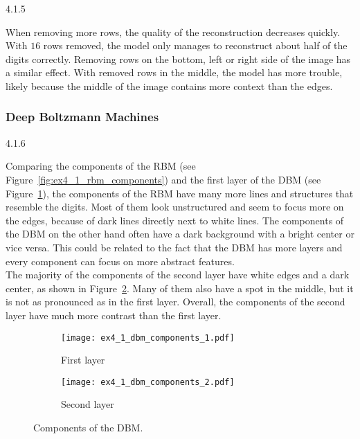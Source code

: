 \begin{task}{4.1.5}
\end{task}

When removing more rows, the quality of the reconstruction decreases quickly. With $16$ rows
removed, the model only manages to reconstruct about half of the digits correctly. Removing rows on
the bottom, left or right side of the image has a similar effect. With removed rows in the middle,
the model has more trouble, likely because the middle of the image contains more context than the
edges.



\subsubsection*{Deep Boltzmann Machines}

\begin{task}{4.1.6}
\end{task}

Comparing the components of the RBM (see Figure~\ref{fig:ex4_1_rbm_components}) and the first layer
of the DBM (see Figure~\ref{fig:ex4_1_dbm_components_1}), the components of the RBM have many more
lines and structures that resemble the digits. Most of them look unstructured and seem to focus more
on the edges, because of dark lines directly next to white lines. The components of the DBM on the
other hand often have a dark background with a bright center or vice versa. This could be related to
the fact that the DBM has more layers and every component can focus on more abstract features.\\
The majority of the components of the second layer have white edges and a dark center, as shown in
Figure~\ref{fig:ex4_1_dbm_components_2}. Many of them also have a spot in the middle, but it is not
as pronounced as in the first layer. Overall, the components of the second layer have much more
contrast than the first layer.

\begin{figure}[ht]
  \centering
  \begin{subfigure}{0.4\textwidth}
    \texttt{[image: ex4\_1\_dbm\_components\_1.pdf]}
    \caption{First layer}
    \label{fig:ex4_1_dbm_components_1}
  \end{subfigure}
  \begin{subfigure}{0.4\textwidth}
    \texttt{[image: ex4\_1\_dbm\_components\_2.pdf]}
    \caption{Second layer}
    \label{fig:ex4_1_dbm_components_2}
  \end{subfigure}
  \caption{Components of the DBM.}
  \label{fig:ex4_1_dbm_components}
\end{figure}



